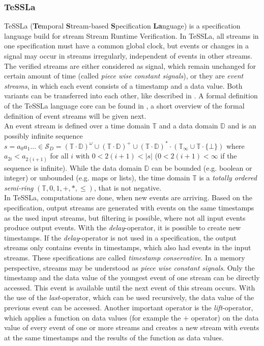 	\subsubsection{TeSSLa}
		TeSSLa (\textbf{Te}mporal \textbf{S}tream-based \textbf{S}pecification \textbf{La}nguage) \cite{TeSSLa1} is a specification language build for stream Stream Runtime Verification. In TeSSLa, all streams in one specification must have a common global clock, but events or changes in a signal may occur in streams irregularly, independent of events in other streams. The verified streams are either considered as signal, which remain unchanged for certain amount of time (called \textit{piece wise constant signals}), or they are \textit{event streams}, in which each event consists of a timestamp and a data value. Both variants can be transferred into each other, like described in \cite{TeSSLa1}. A formal definition of the TeSSLa language core can be found in \cite{TeSSLa2}, a short overview of the formal definition of event streams will be given next.\\
		An event stream is defined over a time domain $\mathbb{T}$ and a data domain $\mathbb{D}$ and is an possibly infinite sequence $s=a_0a_1...\in\mathcal{S}_D=(\mathbb{T}\cdot\mathbb{D})^\omega\cup(\mathbb{T}\cdot\mathbb{D})^+\cup(\mathbb{T}\cdot\mathbb{D})^*\cdot(\mathbb{T}_\infty\cup\mathbb{T}\cdot\{\bot\})$ where $a_{2i} < a_{2(i+1)}$ for all $i$ with $0 < 2(i + 1) < |s|$ ($0 < 2(i + 1) < \infty$ if the sequence is infinite). While the data domain $\mathbb{D}$ can be bounded (e.g. boolean or integer) or unbounded (e.g. maps or lists), the time domain $\mathbb{T}$ is a \emph{totally ordered semi-ring} $(\mathbb{T}, 0, 1, +, *, \leq)$, that is not negative.\\
		In TeSSLa, computations are done, when new events are arriving. Based on the specification, output streams are generated with events on the same timestamps as the used input streams, but filtering is possible, where not all input events produce output events. With the \textit{delay}-operator, it is possible to create new timestamps. If the \textit{delay}-operator is not used in a specification, the output streams only contains events in timestamps, which also had events in the input streams. These specifications are called \textit{timestamp conservative}.
		In a memory perspective, streams may be understood as \textit{piece wise constant signals}. Only the timestamp and the data value of the youngest event of one stream can be directly accessed. This event is available until the next event of this stream occurs. With the use of the \textit{last}-operator, which can be used recursively, the data value of the previous event can be accessed. Another important operator is the \textit{lift}-operator, which applies a function on data values (for example the $+$ operator) on the data value of every event of one or more streams and creates a new stream with events at the same timestamps and the results of the function as data values.
		
